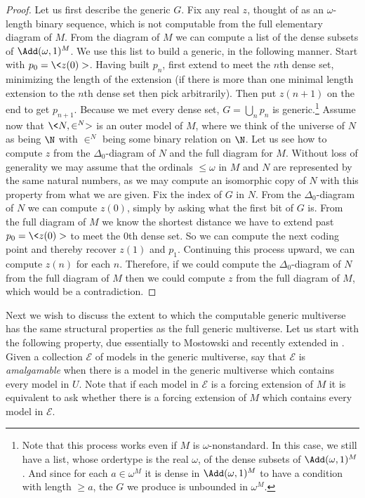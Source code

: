 \documentclass{amsart}
\begin{document}
\begin{proof}
Let us first describe the generic $G$. Fix any real $z$, thought of as an $\omega$-length binary sequence, which is not computable from the full elementary diagram of $M$. From the diagram of $M$ we can compute a list of the dense subsets of $\Add(\omega,1)^M$. We use this list to build a generic, in the following manner. Start with $p_0 = \<z(0)>$. Having built $p_n$, first extend to meet the $n$th dense set, minimizing the length of the extension (if there is more than one minimal length extension to the $n$th dense set then pick arbitrarily). Then put $z(n+1)$ on the end to get $p_{n+1}$. Because we met every dense set, $G = \bigcup_n p_n$ is generic.\footnote{Note that this process works even if $M$ is $\omega$-nonstandard. In this case, we still have a list, whose ordertype is the real $\omega$, of the dense subsets of $\Add(\omega,1)^M$. And since for each $a \in \omega^M$ it is dense in $\Add(\omega,1)^M$ to have a condition with length $\ge a$, the $G$ we produce is unbounded in $\omega^M$.}
Assume now that $\<N,\in^N>$ is an outer model of $M$, where we think of the universe of $N$ as being $\N$ with $\in^N$ being some binary relation on $\N$. Let us see how to compute $z$ from the $\Delta_0$-diagram of $N$ and the full diagram for $M$. Without loss of generality we may assume that the ordinals $\le \omega$ in $M$ and $N$ are represented by the same natural numbers, as we may compute an isomorphic copy of $N$ with this property from what we are given. Fix the index of $G$ in $N$. From the $\Delta_0$-diagram of $N$ we can compute $z(0)$, simply by asking what the first bit of $G$ is. From the full diagram of $M$ we know the shortest distance we have to extend past $p_0 = \<z(0)>$ to meet the $0$th dense set. So we can compute the next coding point and thereby recover $z(1)$ and $p_1$. Continuing this process upward, we can compute $z(n)$ for each $n$. Therefore, if we could compute the $\Delta_0$-diagram of $N$ from the full diagram of $M$ then we could compute $z$ from the full diagram of $M$, which would be a contradiction.
\end{proof}
Next we wish to discuss the extent to which the computable generic multiverse has the same structural properties as the full generic multiverse. Let us start with the following property, due essentially to Mostowski \cite{Mostowski1976} and recently extended in \cite{HHKVW2019}. Given a collection $\mathcal E$ of models in the generic multiverse, say that $\mathcal E$ is \emph{amalgamable} when there is a model in the generic multiverse which contains every model in $U$. Note that if each model in $\mathcal E$ is a forcing extension of $M$ it is equivalent to ask whether there is a forcing extension of $M$ which contains every model in $\mathcal E$.
\end{document}
